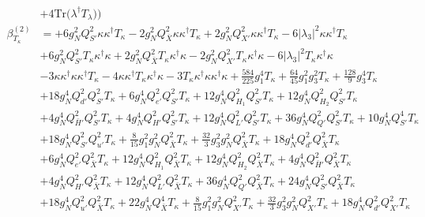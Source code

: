 {\begin{align}
 &+4 \mbox{Tr}\Big({\lambda^{\dagger}  T_{\lambda}}\Big) \Big)\\ 
\beta_{T_{\kappa}}^{(2)} & =  
+6 g_{N}^{2} Q_{S'}^{2} {\kappa  \kappa^{\dagger}  T_{\kappa}} -2 g_{N}^{2} Q_{\bar{X}}^{2} {\kappa  \kappa^{\dagger}  T_{\kappa}} +2 g_{N}^{2} Q_{X'}^{2} {\kappa  \kappa^{\dagger}  T_{\kappa}} -6 |\lambda_3|^2 {\kappa  \kappa^{\dagger}  T_{\kappa}} \nonumber \\ 
 &+6 g_{N}^{2} Q_{S'}^{2} {T_{\kappa}  \kappa^{\dagger}  \kappa} +2 g_{N}^{2} Q_{\bar{X}}^{2} {T_{\kappa}  \kappa^{\dagger}  \kappa} -2 g_{N}^{2} Q_{X'}^{2} {T_{\kappa}  \kappa^{\dagger}  \kappa} -6 |\lambda_3|^2 {T_{\kappa}  \kappa^{\dagger}  \kappa} \nonumber \\ 
 &-3 {\kappa  \kappa^{\dagger}  \kappa  \kappa^{\dagger}  T_{\kappa}} -4 {\kappa  \kappa^{\dagger}  T_{\kappa}  \kappa^{\dagger}  \kappa} -3 {T_{\kappa}  \kappa^{\dagger}  \kappa  \kappa^{\dagger}  \kappa} +\frac{584}{225} g_{1}^{4} T_{\kappa} +\frac{64}{45} g_{1}^{2} g_{3}^{2} T_{\kappa} +\frac{128}{9} g_{3}^{4} T_{\kappa} \nonumber \\ 
 &+18 g_{N}^{4} Q_{d'}^{2} Q_{S'}^{2} T_{\kappa} +6 g_{N}^{4} Q_{e'}^{2} Q_{S'}^{2} T_{\kappa} +12 g_{N}^{4} Q_{H_1}^{2} Q_{S'}^{2} T_{\kappa} +12 g_{N}^{4} Q_{H_2}^{2} Q_{S'}^{2} T_{\kappa} \nonumber \\ 
 &+4 g_{N}^{4} Q_{\bar{H}'}^{2} Q_{S'}^{2} T_{\kappa} +4 g_{N}^{4} Q_{H'}^{2} Q_{S'}^{2} T_{\kappa} +12 g_{N}^{4} Q_{L'}^{2} Q_{S'}^{2} T_{\kappa} +36 g_{N}^{4} Q_{Q'}^{2} Q_{S'}^{2} T_{\kappa} +10 g_{N}^{4} Q_{S'}^{4} T_{\kappa} \nonumber \\ 
 &+18 g_{N}^{4} Q_{S'}^{2} Q_{u'}^{2} T_{\kappa} +\frac{8}{15} g_{1}^{2} g_{N}^{2} Q_{\bar{X}}^{2} T_{\kappa} +\frac{32}{3} g_{3}^{2} g_{N}^{2} Q_{\bar{X}}^{2} T_{\kappa} +18 g_{N}^{4} Q_{d'}^{2} Q_{\bar{X}}^{2} T_{\kappa} \nonumber \\ 
 &+6 g_{N}^{4} Q_{e'}^{2} Q_{\bar{X}}^{2} T_{\kappa} +12 g_{N}^{4} Q_{H_1}^{2} Q_{\bar{X}}^{2} T_{\kappa} +12 g_{N}^{4} Q_{H_2}^{2} Q_{\bar{X}}^{2} T_{\kappa} +4 g_{N}^{4} Q_{\bar{H}'}^{2} Q_{\bar{X}}^{2} T_{\kappa} \nonumber \\ 
 &+4 g_{N}^{4} Q_{H'}^{2} Q_{\bar{X}}^{2} T_{\kappa} +12 g_{N}^{4} Q_{L'}^{2} Q_{\bar{X}}^{2} T_{\kappa} +36 g_{N}^{4} Q_{Q'}^{2} Q_{\bar{X}}^{2} T_{\kappa} +24 g_{N}^{4} Q_{S'}^{2} Q_{\bar{X}}^{2} T_{\kappa} \nonumber \\ 
 &+18 g_{N}^{4} Q_{u'}^{2} Q_{\bar{X}}^{2} T_{\kappa} +22 g_{N}^{4} Q_{\bar{X}}^{4} T_{\kappa} +\frac{8}{15} g_{1}^{2} g_{N}^{2} Q_{X'}^{2} T_{\kappa} +\frac{32}{3} g_{3}^{2} g_{N}^{2} Q_{X'}^{2} T_{\kappa} +18 g_{N}^{4} Q_{d'}^{2} Q_{X'}^{2} T_{\kappa} \nonumber \\ 

\end{align}}
